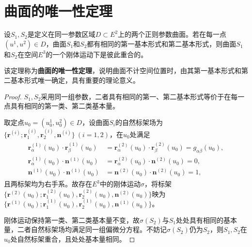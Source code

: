 \documentclass[../../main.tex]{subfiles}%
\begin{document}
\section{曲面的唯一性定理}

\begin{theorem}
设$S_1,S_2$是定义在同一参数区域$D \subset E^2$上的两个正则参数曲面。若在每一点$(u^1,u^2) \in D$，曲面$S_1$和$S_2$都有相同的第一基本形式和第二基本形式，则曲面$S_1$和$S_2$在空间$E^3$的一个刚体运动下是彼此重合的。
\end{theorem}

\begin{remark}
该定理称为\textbf{曲面的唯一性定理}，说明曲面不计空间位置时，由其第一基本形式和第二基本形式唯一确定，具有重要的理论意义。
\end{remark}

\begin{proof}
$S_1,S_2$采用同一组参数，二者具有相同的第一、第二基本形式等价于在每一点具有相同的第一类、第二类基本量。

取定点$u_0=(u_0^1,u_0^2) \in D$，设曲面$S_i$的自然标架场为$\{\boldsymbol{r}^{(i)};\boldsymbol{r}_1^{(i)},\boldsymbol{r}_2^{(i)},\boldsymbol{n}^{(i)}\}\ (i=1,2)$，在$u_0$处满足
\begin{align}
\begin{split}
\boldsymbol{r}_\alpha^{(1)}(u_0) \cdot \boldsymbol{r}_\beta^{(1)}(u_0) &= \boldsymbol{r}_\alpha^{(2)}(u_0) \cdot \boldsymbol{r}_\beta^{(2)}(u_0) = g_{\alpha\beta}(u_0),\\
\boldsymbol{r}_\alpha^{(1)}(u_0) \cdot \boldsymbol{n}^{(1)}(u_0) &= \boldsymbol{r}_\alpha^{(2)}(u_0) \cdot \boldsymbol{n}^{(2)}(u_0) = 0,\\
\boldsymbol{n}^{(1)}(u_0) \cdot \boldsymbol{n}^{(1)}(u_0) &= \boldsymbol{n}^{(2)}(u_0) \cdot \boldsymbol{n}^{(2)}(u_0) = 1,
\end{split}
\label{eq:::IOJIOWAIJ2.1}
\end{align}
且两标架均为右手系。故存在$E^3$中的刚体运动$\sigma$，将标架$\{\boldsymbol{r}^{(2)}(u_0);\boldsymbol{r}_1^{(2)}(u_0),\boldsymbol{r}_2^{(2)}(u_0),\boldsymbol{n}^{(2)}(u_0)\}$映为$\{\boldsymbol{r}^{(1)}(u_0);\boldsymbol{r}_1^{(1)}(u_0),\boldsymbol{r}_2^{(1)}(u_0),\boldsymbol{n}^{(1)}(u_0)\}$。

刚体运动保持第一类、第二类基本量不变，故$\sigma(S_2)$与$S_1$处处具有相同的基本量，二者自然标架场均满足同一组偏微分方程。不妨记$\sigma(S_2)$仍为$S_2$，则$S_1,S_2$在$u_0$处自然标架重合，且处处基本量相同。


\end{proof}
\end{document}
